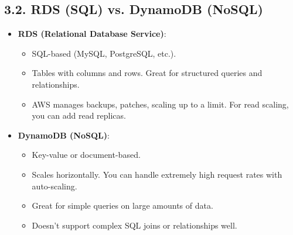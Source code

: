 \documentclass[12pt]{article}
\begin{document}
\subsection*{3.2. RDS (SQL) vs. DynamoDB (NoSQL)}
\begin{itemize}
    \item \textbf{RDS (Relational Database Service)}:
          \begin{itemize}
              \item SQL-based (MySQL, PostgreSQL, etc.).
              \item Tables with columns and rows. Great for structured queries and relationships.
              \item AWS manages backups, patches, scaling up to a limit. For read scaling, you can add read replicas.
          \end{itemize}
    \item \textbf{DynamoDB (NoSQL)}:
          \begin{itemize}
              \item Key-value or document-based.
              \item Scales horizontally. You can handle extremely high request rates with auto-scaling.
              \item Great for simple queries on large amounts of data.
              \item Doesn’t support complex SQL joins or relationships well.
          \end{itemize}
\end{itemize}

\begin{center}
\end{center}
\end{document}
